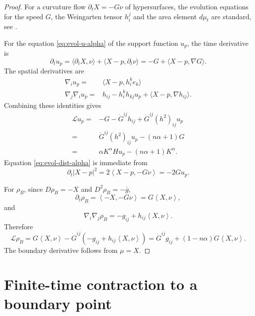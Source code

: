 \documentclass[11pt, reqno]{amsart}
\theoremstyle{remark}
\theoremstyle{definition}
\numberwithin{equation}{section}
\newcommand{\cL}{\mathcal L}
\newcommand{\ol}{\overline}
\newcommand{\ip}[2]{\left\langle #1,#2\right\rangle}
\begin{document}
\begin{proof}
For a curvature flow $\partial_tX=-G\nu$ of hypersurfaces, the evolution equations for the speed $G$, the Weingarten tensor $h_i^j$ and the area element $d\mu_t$ are standard, see \cite{And94,CDKL19}.

For the equation \eqref{eq:evol-u-alpha} of the support function $u_p$, the time derivative is 
\begin{equation*}
    \partial_tu_p=\langle \partial_tX,\nu\rangle +\langle X-p,\partial_t\nu\rangle =-G+\langle X-p,\nabla G\rangle. 
\end{equation*}
The spatial derivatives are
\begin{align*}
       \nabla_iu_p=&\langle X-p,h_i^ke_k\rangle \\
       \nabla_j\nabla_iu_p=&h_{ij}-h_i^kh_{kj}u_p+\langle X-p,\nabla h_{ij}\rangle . 
\end{align*}
Combining these identities gives
\begin{align*}
    \cL u_p=&-G-\dot{G}^{ij}h_{ij}+\dot{G}^{ij}(h^2)_{ij}u_p\\
    =&\dot{G}^{ij}(h^2)_{ij}u_p-(n\alpha+1)G\\
    =&\alpha K^\alpha H u_p-(n\alpha+1)K^\alpha.
\end{align*}
Equation \eqref{eq:evol-dist-alpha} is immediate from
\begin{equation*}
        \partial_t|X-p|^2=2\ip{X-p}{-G\nu}=-2Gu_p.
\end{equation*}


For $\rho_B$, since $D\rho_B=-X$ and $D^2\rho_B=-\ol g$,
\begin{equation*}
        \partial_t\rho_B=\ip{-X}{-G\nu}=G\ip{X}{\nu},
\end{equation*}
and
\begin{equation*}
        \nabla_i\nabla_j\rho_B=-g_{ij}+h_{ij}\ip{X}{\nu}.
\end{equation*}
Therefore
\begin{equation*}
        \cL\rho_B=G\ip{X}{\nu}-\dot G^{ij}(-g_{ij}+h_{ij}\ip{X}{\nu})
        =\dot G^{ij}g_{ij}+(1-n\alpha)G\ip{X}{\nu}.
\end{equation*}
The boundary derivative follows from $\mu=X$.
\end{proof}

\section{Finite-time contraction to a boundary point}
\label{sec:extinction}
\end{document}
